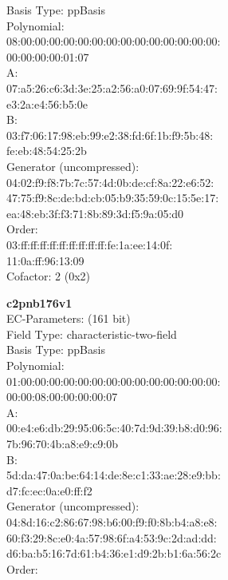 Basis Type: ppBasis\\
Polynomial:\\
    08:00:00:00:00:00:00:00:00:00:00:00:00:00:00:\\
    00:00:00:00:01:07\\
A:   \\
    07:a5:26:c6:3d:3e:25:a2:56:a0:07:69:9f:54:47:\\
    e3:2a:e4:56:b5:0e\\
B:   \\
    03:f7:06:17:98:eb:99:e2:38:fd:6f:1b:f9:5b:48:\\
    fe:eb:48:54:25:2b\\
Generator (uncompressed):\\
    04:02:f9:f8:7b:7c:57:4d:0b:de:cf:8a:22:e6:52:\\
    47:75:f9:8c:de:bd:cb:05:b9:35:59:0c:15:5e:17:\\
    ea:48:eb:3f:f3:71:8b:89:3d:f5:9a:05:d0\\
Order: \\
    03:ff:ff:ff:ff:ff:ff:ff:ff:ff:fe:1a:ee:14:0f:\\
    11:0a:ff:96:13:09\\
Cofactor:  2 (0x2)\\
\item \textbf{ c2pnb176v1 }\\
EC-Parameters: (161 bit)\\
Field Type: characteristic-two-field\\
Basis Type: ppBasis\\
Polynomial:\\
    01:00:00:00:00:00:00:00:00:00:00:00:00:00:00:\\
    00:00:08:00:00:00:00:07\\
A:   \\
    00:e4:e6:db:29:95:06:5c:40:7d:9d:39:b8:d0:96:\\
    7b:96:70:4b:a8:e9:c9:0b\\
B:   \\
    5d:da:47:0a:be:64:14:de:8e:c1:33:ae:28:e9:bb:\\
    d7:fc:ec:0a:e0:ff:f2\\
Generator (uncompressed):\\
    04:8d:16:c2:86:67:98:b6:00:f9:f0:8b:b4:a8:e8:\\
    60:f3:29:8c:e0:4a:57:98:6f:a4:53:9c:2d:ad:dd:\\
    d6:ba:b5:16:7d:61:b4:36:e1:d9:2b:b1:6a:56:2c\\
Order: \\
